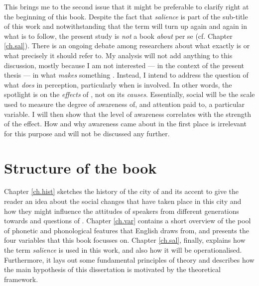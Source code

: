 This brings me to the second issue that it might be preferable to clarify right at the beginning of this book.
Despite the fact that \emph{salience} is part of the sub-title of this work and notwithstanding that the term will turn up again and again in what is to follow, the present study is \emph{not} a book \emph{about}  per se (cf. Chapter \ref{ch.sal}).
There is an ongoing debate among researchers about what exactly  is or what precisely it should refer to.
My analysis will not add anything to this discussion, mostly because I am not interested --- in the context of the present thesis --- in what \emph{makes} something .
Instead, I intend to address the question of what  \emph{does} in perception, particularly when  is involved.
In other words, the spotlight is on the \emph{effects} of , not on its \emph{causes}.
Essentially, social  will be the scale used to measure the degree of awareness of, and attention paid to, a particular variable.
I will then show that the level of awareness correlates with the strength of the  effect.
How and why awareness came about in the first place is irrelevant for this purpose and will not be discussed any further.

\section{Structure of the book}
\label{sec.intro.structure}

Chapter \ref{ch.hist} sketches the history of the city of  and its accent to give the reader an idea about the social changes that have taken place in this city and how they might influence the attitudes of speakers from different generations towards  and questions of .
Chapter \ref{ch.var} contains a short overview of the pool of phonetic and phonological features that  English draws from, and presents the four variables that this book focusses on.
Chapter \ref{ch.sal}, finally, explains how the term \emph{salience} is used in this work, and also how it will be operationalised.
Furthermore, it lays out some fundamental principles of  theory and describes how the main hypothesis of this dissertation is motivated by the theoretical framework.


